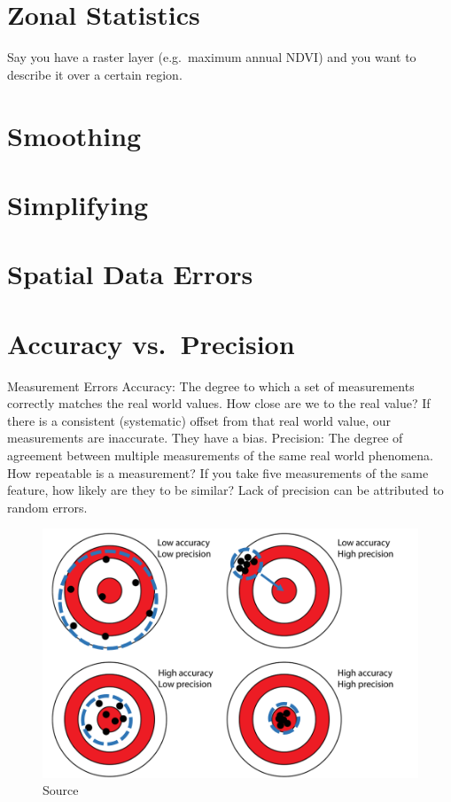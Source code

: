 \documentclass[
]{book}
\begin{document}
\hypertarget{zonal-statistics}{%
\section{Zonal Statistics}\label{zonal-statistics}}

Say you have a raster layer (e.g.~maximum annual NDVI) and you want to describe it over a certain region.

\hypertarget{smoothing-1}{%
\section{Smoothing}\label{smoothing-1}}

\hypertarget{simplifying}{%
\section{Simplifying}\label{simplifying}}

\hypertarget{spatial-data-errors}{%
\section{Spatial Data Errors}\label{spatial-data-errors}}

\hypertarget{accuracy-vs.-precision}{%
\section{Accuracy vs.~Precision}\label{accuracy-vs.-precision}}

Measurement Errors
Accuracy:
The degree to which a set of measurements correctly matches the real world values. How close are we to the real value?
If there is a consistent (systematic) offset from that real world value, our measurements are inaccurate. They have a bias.
Precision:
The degree of agreement between multiple measurements of the same real world phenomena. How repeatable is a measurement?
If you take five measurements of the same feature, how likely are they to be similar? Lack of precision can be attributed to random errors.

\begin{figure}
\centering
\includegraphics{images/16-accuracy-vs-precision.png}
\caption{Source}
\end{figure}
\end{document}
